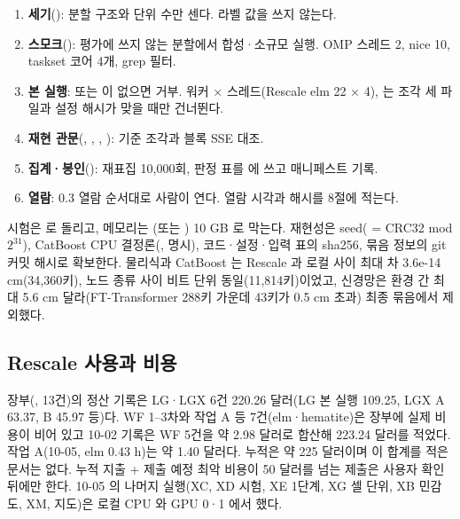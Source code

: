 \begin{enumerate}[leftmargin=1.8em, itemsep=0.1em]
  \item \textbf{세기}(): 분할 구조와 단위 수만 센다. 라벨 값을 쓰지 않는다.
  \item \textbf{스모크}(): 평가에 쓰지 않는 분할에서 합성·소규모 실행. OMP 스레드 2, nice 10, taskset 코어 4개, grep 필터.
  \item \textbf{본 실행}:  또는  이 없으면 거부. 워커 × 스레드(Rescale elm 22 × 4),  는 조각 세 파일과 설정 해시가 맞을 때만 건너뛴다.
  \item \textbf{재현 관문}(, , , ): 기준 조각과 블록 SSE 대조.
  \item \textbf{집계·봉인}(): 재표집 10,000회, 판정 표를  에 쓰고 매니페스트 기록.
  \item \textbf{열람}: 0.3 열람 순서대로 사람이 연다. 열람 시각과 해시를 8절에 적는다.
\end{enumerate}

시험은  로 돌리고, 메모리는 (또는 ) 10 GB 로 막는다. 재현성은 seed( = CRC32 mod $2^{31}$), CatBoost CPU 결정론(,  명시), 코드·설정·입력 표의 sha256, 묶음 정보의 git 커밋 해시로 확보한다. 물리식과 CatBoost 는 Rescale 과 로컬 사이 최대 차 3.6e-14 cm(34,360키), 노드 종류 사이 비트 단위 동일(11,814키)이었고, 신경망은 환경 간 최대 5.6 cm 달라(FT-Transformer 288키 가운데 43키가 0.5 cm 초과) 최종 묶음에서 제외했다.

\subsection{Rescale 사용과 비용}

장부(, 13건)의 정산 기록은 LG·LGX 6건 220.26 달러(LG 본 실행 109.25, LGX A 63.37, B 45.97 등)다. WF 1–3차와 작업 A 등 7건(elm·hematite)은 장부에 실제 비용이 비어 있고 10-02 기록은 WF 5건을 약 2.98 달러로 합산해 223.24 달러를 적었다. 작업 A(10-05, elm 0.43 h)는 약 1.40 달러다. 누적은 약 225 달러이며 이 합계를 적은 문서는 없다. 누적 지출 + 제출 예정 최악 비용이 50 달러를 넘는 제출은 사용자 확인 뒤에만 한다. 10-05 의 나머지 실행(XC, XD 시험, XE 1단계, XG 셀 단위, XB 민감도, XM, 지도)은 로컬 CPU 와 GPU 0·1 에서 했다.

